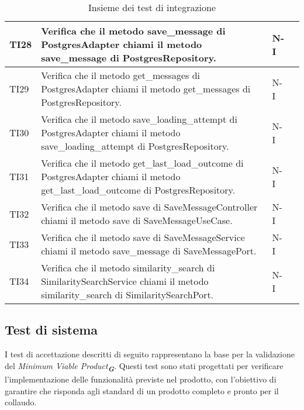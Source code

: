 \begin{table}[h!]
\begin{tabularx}{\textwidth}{|p{}|X|p{}|p{}|}
    TI28 & Verifica che il metodo save\_message di PostgresAdapter chiami il metodo save\_message di PostgresRepository. &  N-I \\ \hline
    TI29 & Verifica che il metodo get\_messages di PostgresAdapter chiami il metodo get\_messages di PostgresRepository. & N-I \\ \hline
    TI30 & Verifica che il metodo save\_loading\_attempt di PostgresAdapter chiami il metodo save\_loading\_attempt di PostgresRepository. &  N-I \\ \hline
    TI31 & Verifica che il metodo get\_last\_load\_outcome di PostgresAdapter chiami il metodo get\_last\_load\_outcome di PostgresRepository. &  N-I \\ \hline
    TI32 & Verifica che il metodo save di SaveMessageController chiami il metodo save di SaveMessageUseCase. &  N-I \\ \hline
    TI33 & Verifica che il metodo save di SaveMessageService chiami il metodo save\_message di SaveMessagePort. &  N-I \\ \hline
    TI34 & Verifica che il metodo similarity\_search di SimilaritySearchService chiami il metodo similarity\_search di SimilaritySearchPort. &  N-I \\ \hline
    \end{tabularx}
    \caption{Insieme dei test di integrazione}
\end{table}

\newpage

\subsection{Test di sistema}
\label{sec:Test di sistema}
I test di accettazione descritti di seguito rappresentano la base per la validazione del \emph{Minimum Viable Product}\textsubscript{\textit{\textbf{G}}}. Questi test sono stati progettati per verificare l’implementazione delle funzionalità previste nel prodotto, con l’obiettivo di garantire che risponda agli standard di un prodotto completo e pronto per il collaudo.

